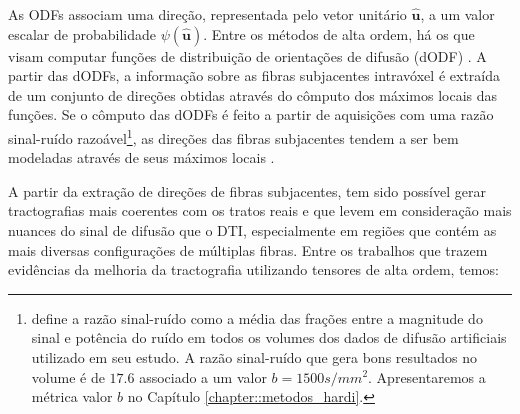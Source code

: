 \documentclass[
    12pt,                %
    oneside,            %
    a4paper,            %
    english,            %
    french,                %
    spanish,            %
    brazil                %
    ]{abntex2}
\begin{document}
As ODFs associam uma direção, representada pelo vetor unitário $\mathbf{\hat{u}}$, a um valor escalar de probabilidade $\psi(\mathbf{\hat{u}})$. Entre os métodos de alta ordem, há os que visam computar funções de distribuição de orientações de difusão (dODF) \cite{TuchQBall2004, wedeen2005, yeh2010}. A partir das dODFs, a informação sobre as fibras subjacentes intravóxel é extraída de um conjunto de direções obtidas através do cômputo dos máximos locais das funções. Se o cômputo das dODFs é feito a partir de aquisições com uma razão sinal-ruído %
razoável\footnote{  define a razão sinal-ruído como a média das frações entre a magnitude do sinal e potência do ruído em todos os volumes dos dados de difusão artificiais utilizado em seu estudo. A razão sinal-ruído que gera bons resultados no volume é de $17.6$ associado a um valor $b = 1500 s/mm^2$. Apresentaremos a métrica valor $b$ no Capítulo \ref{chapter::metodos_hardi}.}, as direções das fibras subjacentes tendem a ser bem modeladas através de seus máximos locais \cite{fillard2011}.




A partir da extração de direções de fibras subjacentes, tem sido possível gerar tractografias mais coerentes com os tratos reais e que levem em consideração mais nuances do sinal de difusão que o DTI, especialmente em regiões que contém as mais diversas configurações de múltiplas fibras. Entre os trabalhos que trazem evidências da melhoria da tractografia utilizando tensores de alta ordem, temos:
\end{document}

